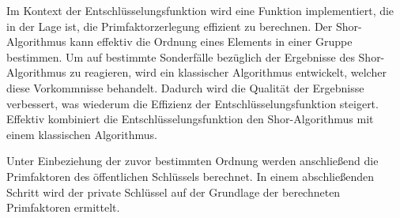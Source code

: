 Im Kontext der Entschlüsselungsfunktion wird eine Funktion implementiert,
die in der Lage ist, die Primfaktorzerlegung effizient zu berechnen.
Der Shor-Algorithmus kann effektiv die Ordnung eines Elements in einer Gruppe bestimmen. 
Um auf bestimmte Sonderfälle bezüglich der Ergebnisse des Shor-Algorithmus zu reagieren, 
wird ein klassischer Algorithmus entwickelt, welcher diese Vorkommnisse behandelt. 
Dadurch wird die Qualität der Ergebnisse verbessert, was wiederum die Effizienz der Entschlüsselungsfunktion steigert.
Effektiv kombiniert die Entschlüsselungsfunktion den Shor-Algorithmus mit einem klassischen Algorithmus.

Unter Einbeziehung der zuvor bestimmten Ordnung werden anschließend die Primfaktoren des öffentlichen Schlüssels berechnet.
In einem abschließenden Schritt wird der private Schlüssel auf der Grundlage der berechneten Primfaktoren ermittelt.



